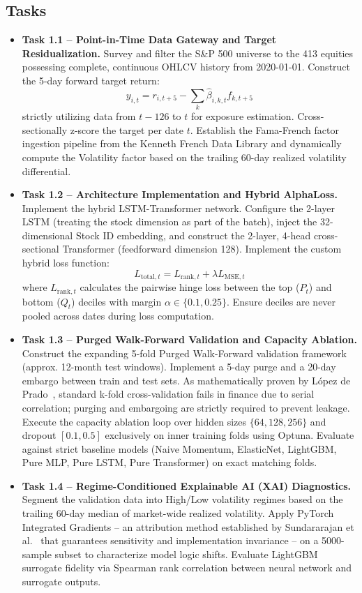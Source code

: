 \subsection*{Tasks}
\begin{itemize}
    \item \textbf{Task 1.1 -- Point-in-Time Data Gateway and Target Residualization.} Survey and filter the S\&P 500 universe to the 413 equities possessing complete, continuous OHLCV history from 2020-01-01. Construct the 5-day forward target return:
          \[
              y_{i,t} = r_{i,t+5} - \sum_{k}\hat{\beta}_{i,k,t}f_{k,t+5}
          \]
          strictly utilizing data from $t-126$ to $t$ for exposure estimation. Cross-sectionally z-score the target per date $t$. Establish the Fama-French factor ingestion pipeline from the Kenneth French Data Library and dynamically compute the Volatility factor based on the trailing 60-day realized volatility differential.

    \item \textbf{Task 1.2 -- Architecture Implementation and Hybrid AlphaLoss.} Implement the hybrid LSTM-Transformer network. Configure the 2-layer LSTM (treating the stock dimension as part of the batch), inject the 32-dimensional Stock ID embedding, and construct the 2-layer, 4-head cross-sectional Transformer (feedforward dimension 128). Implement the custom hybrid loss function:
          \[
              L_{\text{total},t} = L_{\text{rank},t} + \lambda L_{\text{MSE},t}
          \]
          where $L_{\text{rank},t}$ calculates the pairwise hinge loss between the top ($P_t$) and bottom ($Q_t$) deciles with margin $\alpha \in \{0.1, 0.25\}$. Ensure deciles are never pooled across dates during loss computation.

    \item \textbf{Task 1.3 -- Purged Walk-Forward Validation and Capacity Ablation.} Construct the expanding 5-fold Purged Walk-Forward validation framework (approx. 12-month test windows). Implement a 5-day purge and a 20-day embargo between train and test sets. As mathematically proven by López de Prado~\cite{LopezdePrado2018}, standard k-fold cross-validation fails in finance due to serial correlation; purging and embargoing are strictly required to prevent leakage. Execute the capacity ablation loop over hidden sizes $\{64, 128, 256\}$ and dropout $[0.1, 0.5]$ exclusively on inner training folds using Optuna. Evaluate against strict baseline models (Naive Momentum, ElasticNet, LightGBM, Pure MLP, Pure LSTM, Pure Transformer) on exact matching folds.

    \item \textbf{Task 1.4 -- Regime-Conditioned Explainable AI (XAI) Diagnostics.} Segment the validation data into High/Low volatility regimes based on the trailing 60-day median of market-wide realized volatility. Apply PyTorch Integrated Gradients -- an attribution method established by Sundararajan et al.~\cite{Sundararajan2017} that guarantees sensitivity and implementation invariance -- on a 5000-sample subset to characterize model logic shifts. Evaluate LightGBM surrogate fidelity via Spearman rank correlation between neural network and surrogate outputs.
\end{itemize}

